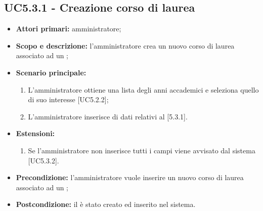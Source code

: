 \documentclass[AnalisiDeiRequisiti.tex]{subfiles}
\begin{document}
\subsection{UC5.3.1 - Creazione corso di laurea}
\begin{itemize}
	\item \textbf{Attori primari:} amministratore;
	\item \textbf{Scopo e descrizione:} l'amministratore crea un nuovo corso di laurea associato ad un ;
	\item \textbf{Scenario principale:}
		\begin{enumerate}
			\item L'amministratore ottiene una lista degli anni accademici e seleziona quello di suo interesse [UC5.2.2];
			\item L'amministratore inserisce di dati relativi al  [5.3.1].
		\end{enumerate}
	\item \textbf{Estensioni:}
		\begin{enumerate}
			\item Se l'amministratore non inserisce tutti i campi viene avvisato dal sistema [UC5.3.2].
		\end{enumerate}
	\item \textbf{Precondizione:} l'amministratore vuole inserire un nuovo corso di laurea associato ad un ; 
	\item \textbf{Postcondizione:} il  è stato creato ed inserito nel sistema.
\end{itemize}
\end{document}
